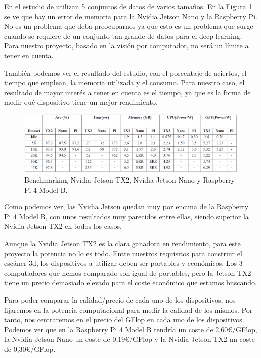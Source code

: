 En el estudio de \cite{Suzen2020} utilizan 5 conjuntos de datos de varios tamaños.
En la Figura \ref{fig:resultados-benchmark-tx2-nano-raspberry} se ve que hay un error de memoria para la Nvidia Jetson Nano y la Raspberry Pi.
No es un problema que deba preocuparnos ya que esto es un problema que surge cuando se requiere de un conjunto tan grande de datos para el deep learning.
Para nuestro proyecto, basado en la visión por computador, no será un límite a tener en cuenta.

También podemos ver el resultado del estudio, con el porcentaje de aciertos, el tiempo que emplean, la memoria utilizada y el consumo.
Para nuestro caso, el resultado de mayor interés a tener en cuenta es el tiempo, ya que es la forma de medir qué dispositivo tiene un mejor rendimiento.

\begin{figure}[h]
    \centering
    \includegraphics[width=\linewidth]{archivos/resultados-benchmark-tx2-nano-raspberry.png}
    \caption{Benchmarking Nvidia Jetson TX2, Nvidia Jetson Nano y Raspberry Pi 4 Model B.}
    \label{fig:resultados-benchmark-tx2-nano-raspberry}
\end{figure}

Como podemos ver, las Nvidia Jetson quedan muy por encima de la Raspberry Pi 4 Model B, con unos resultados muy parecidos entre ellas, siendo superior la Nvidia Jetson TX2 en todos los casos.

Aunque la Nvidia Jetson TX2 es la clara ganadora en rendimiento, para este proyecto la potencia no lo es todo.
Entre nuestros requisitos para construir el escáner \gls{3d}, los dispositivos a utilizar deben ser portables y económicos. Los 3 computadores que hemos comparado son igual de portables, pero la Jetson TX2 tiene un precio demasiado elevado para el coste económico que estamos buscando.

Para poder comparar la calidad/precio de cada uno de los dispositivos, nos fijaremos en la potencia computacional para medir la calidad de los mismos.
Por tanto, nos centraremos en el precio del GFlop en cada uno de los dispositivos.
Podemos ver que en la Raspberry Pi 4 Model B tendría un coste de 2,60€/GFlop, la Nvidia Jetson Nano un coste de 0,19€/GFlop y la Nvidia Jetson TX2 un coste de 0,30€/GFlop.

